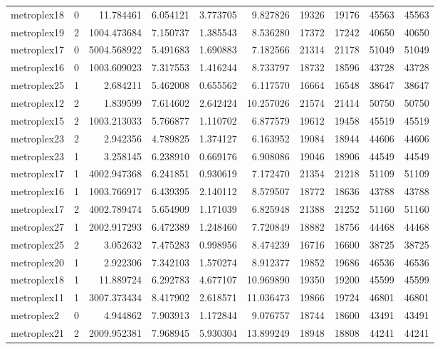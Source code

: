 \begin{longtable}{|l|r|r|r|r|r|r|r|r|r|}
metroplex18 & 0 & 11.784461 & 6.054121 & 3.773705 & 9.827826 & 19326 & 19176 & 45563 & 45563 \\
metroplex19 & 2 & 1004.473684 & 7.150737 & 1.385543 & 8.536280 & 17372 & 17242 & 40650 & 40650 \\
metroplex17 & 0 & 5004.568922 & 5.491683 & 1.690883 & 7.182566 & 21314 & 21178 & 51049 & 51049 \\
metroplex16 & 0 & 1003.609023 & 7.317553 & 1.416244 & 8.733797 & 18732 & 18596 & 43728 & 43728 \\
metroplex25 & 1 & 2.684211 & 5.462008 & 0.655562 & 6.117570 & 16664 & 16548 & 38647 & 38647 \\
metroplex12 & 2 & 1.839599 & 7.614602 & 2.642424 & 10.257026 & 21574 & 21414 & 50750 & 50750 \\
metroplex15 & 2 & 1003.213033 & 5.766877 & 1.110702 & 6.877579 & 19612 & 19458 & 45519 & 45519 \\
metroplex23 & 2 & 2.942356 & 4.789825 & 1.374127 & 6.163952 & 19084 & 18944 & 44606 & 44606 \\
metroplex23 & 1 & 3.258145 & 6.238910 & 0.669176 & 6.908086 & 19046 & 18906 & 44549 & 44549 \\
metroplex17 & 1 & 4002.947368 & 6.241851 & 0.930619 & 7.172470 & 21354 & 21218 & 51109 & 51109 \\
metroplex16 & 1 & 1003.766917 & 6.439395 & 2.140112 & 8.579507 & 18772 & 18636 & 43788 & 43788 \\
metroplex17 & 2 & 4002.789474 & 5.654909 & 1.171039 & 6.825948 & 21388 & 21252 & 51160 & 51160 \\
metroplex27 & 1 & 2002.917293 & 6.472389 & 1.248460 & 7.720849 & 18882 & 18756 & 44468 & 44468 \\
metroplex25 & 2 & 3.052632 & 7.475283 & 0.998956 & 8.474239 & 16716 & 16600 & 38725 & 38725 \\
metroplex20 & 1 & 2.922306 & 7.342103 & 1.570274 & 8.912377 & 19852 & 19686 & 46536 & 46536 \\
metroplex18 & 1 & 11.889724 & 6.292783 & 4.677107 & 10.969890 & 19350 & 19200 & 45599 & 45599 \\
metroplex11 & 1 & 3007.373434 & 8.417902 & 2.618571 & 11.036473 & 19866 & 19724 & 46801 & 46801 \\
metroplex2 & 0 & 4.944862 & 7.903913 & 1.172844 & 9.076757 & 18744 & 18600 & 43491 & 43491 \\
metroplex21 & 2 & 2009.952381 & 7.968945 & 5.930304 & 13.899249 & 18948 & 18808 & 44241 & 44241 \\

\end{longtable}
